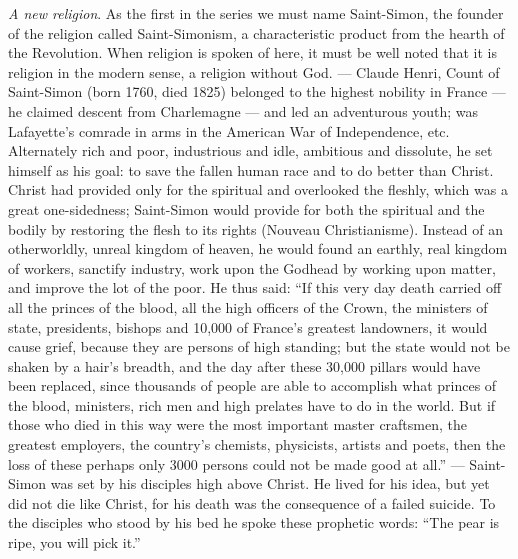 \documentclass[12pt,a4paper,openany]{book}
\newcommand{\opage}[1]{\marginnote{\footnotesize\textit{[#1]}}}
\begin{document}
\emph{A new religion}. As the first in the series
we must name Saint-Simon, the founder of the religion
called Saint-Simonism, a characteristic product
from the hearth of the Revolution. When religion is spoken of here,
it must be well noted that it is religion in the modern sense,
a religion without God. --- Claude Henri, Count
of Saint-Simon (born 1760, died 1825) belonged to the highest
nobility in France --- he claimed descent from Charlemagne
--- and led an adventurous youth; was Lafayette's
comrade in arms in the American War of Independence, etc.
Alternately rich and poor, industrious and idle, ambitious
and dissolute, he set himself as his goal: to save the
fallen human race and to do better than Christ.
Christ had provided only for the spiritual and overlooked
the fleshly, which was a great one-sidedness; Saint-Simon
would provide for both the spiritual and the bodily
by restoring the flesh to its rights (Nouveau
Christianisme). Instead of an otherworldly, unreal kingdom
of heaven, he would found an earthly, real kingdom of workers,
sanctify industry, work upon the Godhead
by working upon matter, and improve the lot of the poor.
He thus said: ``If this very day death carried off
all the princes of the blood, all the high officers of the Crown,
the ministers of state, presidents, bishops and 10,000
\setcounter{footnote}{0}%
\opage{81}of France's greatest landowners, it would cause grief,
because they are persons of high standing; but the state would
not be shaken by a hair's breadth, and the day after these
30,000 pillars would have been replaced, since thousands of
people are able to accomplish what princes
of the blood, ministers, rich men and high prelates have to
do in the world. But if those who died in this way were
the most important master craftsmen, the greatest employers,
the country's chemists, physicists, artists and poets,
then the loss of these perhaps only 3000 persons
could not be made good at all.'' --- Saint-Simon was set by his
disciples high above Christ. He lived for his
idea, but yet did not die like Christ, for his death
was the consequence of a failed suicide. To the disciples
who stood by his bed he spoke these prophetic
words: ``The pear is ripe, you will pick it.''
\end{document}
